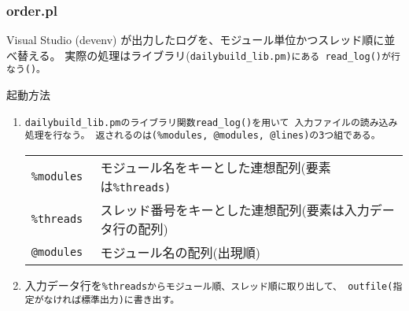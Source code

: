 \subsubsection{order.pl}
\label{subsubsec:order}

\medskip
\noindent
Visual Studio (devenv) が出力したログを、モジュール単位かつスレッド順に並べ替える。
実際の処理はライブラリ(\tt{dailybuild\_lib.pm})にある
\tt{read_log()}が行なう()。

\bigskip
\noindent
起動方法

\begin{CmndOpts}[6em]
\end{CmndOpts}

\begin{CmndArgs}[6em]
\end{CmndArgs}

\begin{Process}
\begin{enumerate}
  \item	\tt{dailybuild\_lib.pm}のライブラリ関数\tt{read\_log()}を用いて
	入力ファイルの読み込み処理を行なう。
	返されるのは(\tt{\%modules, @modules, @lines})の3つ組である。\\
	\vspace{-.7\baselineskip}
	\begin{narrow}[10pt]\small{\begin{tabular}{ll}
	    \tt{\%modules}
		& モジュール名をキーとした連想配列(要素は\tt{\%threads})\\
	    \tt{\%threads}
		& スレッド番号をキーとした連想配列(要素は入力データ行の配列)\\
	    \tt{@modules}
		& モジュール名の配列(出現順)
	\end{tabular}}\end{narrow}
	\medskip

  \item	入力データ行を\tt{\%threads}からモジュール順、スレッド順に取り出して、
	\tt{outfile}(指定がなければ標準出力)に書き出す。

\end{enumerate}
\end{Process}

